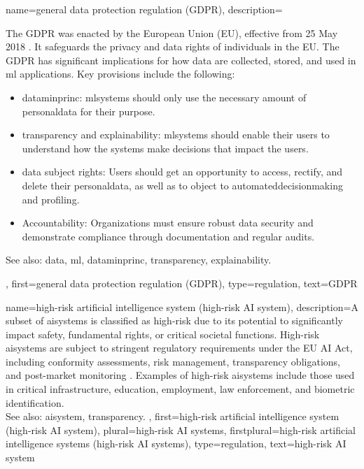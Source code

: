 {name={general data protection regulation (GDPR)},
	description={The GDPR
		was enacted by the European Union (EU), effective from 25 May 2018 \cite{GDPR2016}. 
		It safeguards the privacy and \gls{data} rights of individuals in the EU. 
		The GDPR has significant implications for how \gls{data} are collected, stored, 
		and used in \gls{ml} applications. Key provisions include the following:
		\begin{itemize}
			\item \Gls{dataminprinc}: \glspl{mlsystem} should only use the necessary 
			amount of \gls{personaldata} for their purpose.
			\item \Gls{transparency} and \gls{explainability}: \glspl{mlsystem} should 
			enable their users to understand how the systems make decisions that impact the users.
			\item \Gls{data} subject rights: Users should get an opportunity to access, 
			rectify, and delete their \gls{personaldata}, as well as to object to 
			\gls{automateddecisionmaking} and \gls{profiling}.
			\item Accountability: Organizations must ensure robust \gls{data} security 
			and demonstrate compliance through documentation and regular audits.
		\end{itemize}
		See also: \gls{data}, \gls{ml}, \gls{dataminprinc}, \gls{transparency}, \gls{explainability}.}, 
	first={general data protection regulation (GDPR)},
	type=regulation, 
	text={GDPR}
}

{name={high-risk artificial intelligence system (high-risk AI system)},
	description={A subset 
		of \glspl{aisystem} is classified as 
		high-risk due to its potential to significantly impact 
		safety, fundamental rights, or critical societal functions. 
		High-risk \glspl{aisystem} are subject to stringent regulatory 
		requirements under the EU AI Act, 
		including conformity assessments, risk management, 
		\gls{transparency} obligations, and post-market monitoring \cite{EUAIAct2024}. 
		Examples of high-risk \glspl{aisystem} include those used in 
		critical infrastructure, education, employment, law enforcement, 
		and biometric identification.
		\\
		See also: \gls{aisystem}, \gls{transparency}. },
 	first={high-risk artificial intelligence system (high-risk AI system)},
 	plural={high-risk AI systems},
 	firstplural={high-risk artificial intelligence systems (high-risk AI systems)},
 	type=regulation,
	text={high-risk AI system}
}

